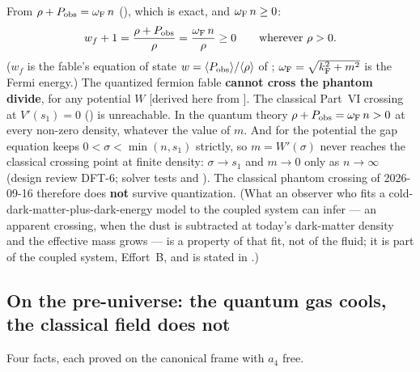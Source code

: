From $\rho+P_{\mathrm{obs}}=\omega_{\mathrm{F}}\,n$ (), which is exact, and $\omega_{\mathrm{F}}\,n\geq0$:
\[
  w_f+1=\frac{\rho+P_{\mathrm{obs}}}{\rho}=\frac{\omega_{\mathrm{F}}\,n}{\rho}\geq0\qquad\text{wherever }\rho>0 .
\]
($w_f$ is the fable's equation of state $w=\langle P_{\mathrm{obs}}\rangle/\langle\rho\rangle$ of
; $\omega_{\mathrm{F}}=\sqrt{k_{\mathrm{F}}^2+m^2}$ is the Fermi energy.)
The quantized fermion fable \textbf{cannot cross the phantom divide}, for any potential $W$ [derived
here from ]. The classical Part~VI crossing at $V'(s_1)=0$
() is unreachable. In the quantum theory $\rho+P_{\mathrm{obs}}=\omega_{\mathrm{F}}\,n>0$ at every non-zero
density, whatever the value of $m$. And for the  potential the gap equation keeps
$0<\sigma<\min(n,s_1)$ strictly, so $m=W'(\sigma)$ never reaches the classical crossing point at
finite density: $\sigma\to s_1$ and $m\to0$ only as $n\to\infty$ (design review DFT-6; solver tests
 and
). The classical phantom
crossing of 2026-09-16 therefore does \textbf{not} survive quantization. (What an observer who fits a
cold-dark-matter-plus-dark-energy model to the coupled system can infer --- an apparent crossing, when
the dust is subtracted at today's dark-matter density and the effective mass grows --- is a property
of that fit, not of the fluid; it is part of the coupled system, Effort~B, and is stated in
.)

\subsection{On the pre-universe: the quantum gas cools, the classical field does not}
\label{sec:8.10}

Four facts, each proved on the canonical frame with $a_4$ free.

